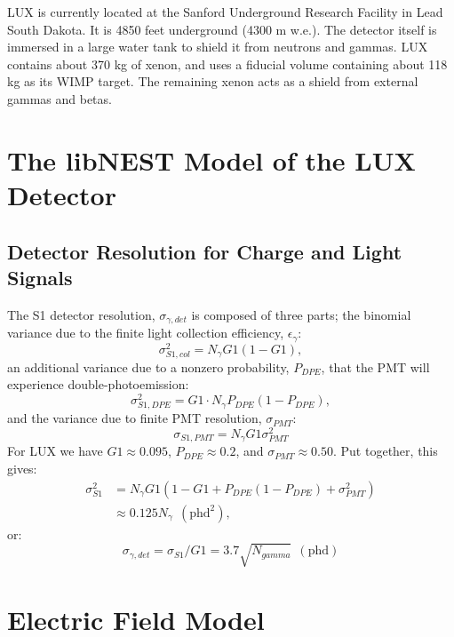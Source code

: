  LUX is currently located at the Sanford Underground Research Facility in Lead South Dakota. It is 4850 feet underground (4300 m w.e.). The detector itself is immersed in a large water tank to shield it from neutrons and gammas. LUX contains about 370 kg of xenon, and uses a fiducial volume containing about 118 kg as its WIMP target. The remaining xenon acts as a shield from external gammas and betas. 
 
 \section{The libNEST Model of the LUX Detector}\label{sec:libnest}
 
 \subsection{Detector Resolution for Charge and Light Signals}\label{sec:detres}
 
 The S1 detector resolution, $\sigma_{\gamma,det}$ is composed of three parts; the binomial variance due to the finite light collection efficiency, $\epsilon_{\gamma}$:
\begin{equation}
\sigma_{S1,col}^2=N_{\gamma}G1(1-G1), 
\end{equation}
an additional variance due to a nonzero probability, $P_{DPE}$, that the PMT will experience double-photoemission\cite{DPE}:
\begin{equation}
\sigma_{S1,DPE}^2=G1\cdot N_{\gamma}P_{DPE}(1-P_{DPE}), 
\end{equation}
and the variance due to finite PMT resolution, $\sigma_{PMT}$:
\begin{equation}
\sigma_{S1,PMT}=N_{\gamma}G1\sigma_{PMT}^2
\end{equation}
For LUX we have $G1\approx 0.095$, $P_{DPE}\approx 0.2$, and $\sigma_{PMT}\approx 0.50$. Put together, this gives:
\begin{equation}
\begin{split}
\sigma_{S1}^2&=N_{\gamma}G1(1-G1+P_{DPE}(1-P_{DPE})+\sigma_{PMT}^2)\\
&\approx 0.125 N_{\gamma} \ \ (\text{phd}^2),
\end{split}
\end{equation}
or:
\begin{equation}
\sigma_{\gamma,det}=\sigma_{S1}/G1=3.7 \sqrt{N_{gamma}} \ \  (\text{phd})
\end{equation}
 
 \section{Electric Field Model}\label{sec:efield}
 \cite{lux_efield}
 

